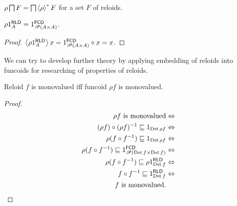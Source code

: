 \begin{conjecture}
$\rho\bigsqcap F=\bigsqcap\left\langle \rho\right\rangle ^{\ast}F$ for a set $F$ of reloids.\end{conjecture}
\begin{prop}
$\rho1_{A}^{\mathsf{RLD}}=1_{\mathscr{P}(A\times A)}^{\mathsf{FCD}}$.\end{prop}
\begin{proof}
$\left\langle \rho1_{A}^{\mathsf{RLD}}\right\rangle x=1_{\mathscr{P}(A\times A)}^{\mathsf{FCD}}\circ x=x$.
\end{proof}
We can try to develop further theory by applying embedding of reloids
into funcoids for researching of properties of reloids.
\begin{thm}
Reloid $f$ is monovalued iff funcoid $\rho f$ is monovalued.\end{thm}
\begin{proof}
~
\begin{align*}
\rho f\text{ is monovalued} & \Leftrightarrow\\
(\rho f)\circ(\rho f)^{-1}\sqsubseteq1_{\operatorname{Dst}\rho f} & \Leftrightarrow\\
\rho(f\circ f^{-1})\sqsubseteq1_{\operatorname{Dst}\rho f} & \Leftrightarrow\\
\rho(f\circ f^{-1})\sqsubseteq1_{\mathscr{P}(\operatorname{Dst} f\times\operatorname{Dst} f)}^{\mathsf{FCD}} & \Leftrightarrow\\
\rho(f\circ f^{-1})\sqsubseteq\rho1_{\operatorname{Dst} f}^{\mathsf{RLD}} & \Leftrightarrow\\
f\circ f^{-1}\sqsubseteq1_{\operatorname{Dst} f}^{\mathsf{RLD}} & \Leftrightarrow\\
f\text{ is monovalued}.
\end{align*}
\end{proof}

